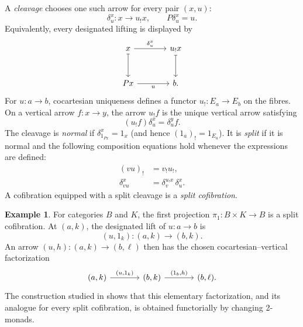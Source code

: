 \documentclass[11pt]{article}
\theoremstyle{plain}
\theoremstyle{definition}
\newtheorem{example}[theorem]{Example}
\theoremstyle{remark}
\numberwithin{equation}{section}
\begin{document}
A \emph{cleavage} chooses one such arrow for every pair $(x,u)$:
\begin{equation}
\delta^{x}_{u}\colon x\longrightarrow u_{!}x,
  \qquad
  P\delta^{x}_{u}=u.
  \label{eq:cleavage}
\end{equation}
Equivalently, every designated lifting is displayed by
\begin{equation*}
\begin{tikzcd}[column sep=large,row sep=large]
x \arrow[r,"\delta^{x}_{u}"] \arrow[d,mapsto]
  & u_{!}x \arrow[d,mapsto] \\
Px \arrow[r,"u"'] & b .
\end{tikzcd}
\end{equation*}
For $u\colon a\to b$, cocartesian uniqueness defines a functor
$u_{!}\colon E_a\to E_b$ on the fibres.  On a vertical arrow
$f\colon x\to y$, the arrow $u_{!}f$ is the unique vertical arrow
satisfying
\begin{equation}
(u_{!}f)\delta^{x}_{u}=\delta^{y}_{u}f.
  \label{eq:pushforward-arrow}
\end{equation}
The cleavage is \emph{normal} if
$\delta^{x}_{1_{Px}}=1_x$ (and hence $(1_a)_!=1_{E_a}$).  It is
\emph{split} if it is normal and the following composition equations hold
whenever the expressions are defined:
\begin{align}
  (vu)_{!}&=v_{!}u_{!},
  \label{eq:split-functors}\\
  \delta^{x}_{vu}&=\delta^{u_{!}x}_{v}\,\delta^{x}_{u}.
  \label{eq:split-delta}
\end{align}
A cofibration equipped with a split cleavage is a \emph{split
cofibration}.

\begin{example}\label{ex:product-cofibration}
For categories $B$ and $K$, the first projection
$\pi_1\colon B\times K\to B$ is a split cofibration.  At
$(a,k)$, the designated lift of $u\colon a\to b$ is
\begin{equation*}
  (u,1_k)\colon(a,k)\longrightarrow(b,k).
\end{equation*}
An arrow $(u,h)\colon(a,k)\to(b,\ell)$ then has the chosen
cocartesian--vertical factorization
\begin{equation*}
\begin{tikzcd}[column sep=large]
(a,k) \arrow[r,"{(u,1_k)}"]
  & (b,k) \arrow[r,"{(1_b,h)}"]
  & (b,\ell).
\end{tikzcd}
\end{equation*}
The construction studied in  shows that this
elementary factorization, and its analogue for every split
cofibration, is obtained functorially by changing 2-monads.
\end{example}
\end{document}
